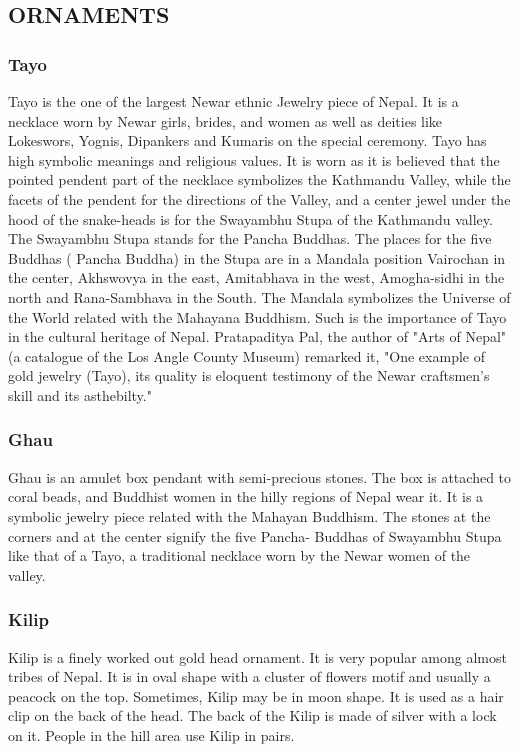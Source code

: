 \documentclass[a4paper,13pt, margin=0.9in]{article}
\begin{document}
\begin{flushleft}
	\newpage
	\subsection{ORNAMENTS}
	\subsubsection{Tayo}
	Tayo is the one of the largest Newar ethnic Jewelry piece of Nepal. It is a necklace worn by Newar girls, brides, and women as well as deities like Lokeswors, Yognis, Dipankers and Kumaris on the special ceremony. Tayo has high symbolic meanings and religious values. It is worn as it is believed that the pointed pendent part of the necklace symbolizes the Kathmandu Valley, while the facets of the pendent for the directions of the Valley, and a center jewel under the hood of the snake-heads is for the Swayambhu Stupa of the Kathmandu valley. The Swayambhu Stupa stands for the Pancha Buddhas. The places for the five Buddhas ( Pancha Buddha) in the Stupa are in a Mandala position Vairochan in the center, Akhswovya in the east, Amitabhava in the west, Amogha-sidhi in the north and Rana-Sambhava in the South. The Mandala symbolizes the Universe of the World related with the Mahayana Buddhism. Such is the importance of Tayo in the cultural heritage of Nepal. Pratapaditya Pal, the author of "Arts of Nepal" (a catalogue of the Los Angle County Museum) remarked it, "One example of gold jewelry (Tayo), its quality is eloquent testimony of the Newar craftsmen's skill and its asthebilty."

	\subsubsection{Ghau}
	Ghau is an amulet box pendant with semi-precious stones. The box is attached to coral beads, and Buddhist women in the hilly regions of Nepal wear it. It is a symbolic jewelry piece related with the Mahayan Buddhism. The stones at the corners and at the center signify the five Pancha- Buddhas of Swayambhu Stupa like that of a Tayo, a traditional necklace worn by the Newar women of the valley.



	\subsubsection{Kilip}
	Kilip is a finely worked out gold head ornament. It is very popular among almost tribes of Nepal. It is in oval shape with a cluster of flowers motif and usually a peacock on the top. Sometimes, Kilip may be in moon shape. It is used as a hair clip on the back of the head. The back of the Kilip is made of silver with a lock on it. People in the hill area use Kilip in pairs.


\end{flushleft}
\end{document}

